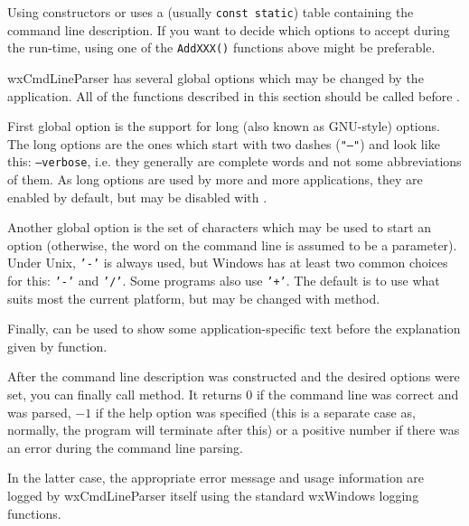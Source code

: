 Using constructors or  uses a (usually 
{\tt const static}) table containing the command line description. If you want
to decide which options to accept during the run-time, using one of the 
{\tt AddXXX()} functions above might be preferable.

\label{wxcmdlineparsercustomization}

wxCmdLineParser has several global options which may be changed by the
application. All of the functions described in this section should be called
before .

First global option is the support for long (also known as GNU-style) options.
The long options are the ones which start with two dashes ({\tt "--"}) and look
like this: {\tt --verbose}, i.e. they generally are complete words and not some
abbreviations of them. As long options are used by more and more applications,
they are enabled by default, but may be disabled with 
.

Another global option is the set of characters which may be used to start an
option (otherwise, the word on the command line is assumed to be a parameter).
Under Unix, {\tt '-'} is always used, but Windows has at least two common
choices for this: {\tt '-'} and {\tt '/'}. Some programs also use {\tt '+'}.
The default is to use what suits most the current platform, but may be changed
with  method.

Finally,  can be used to show some
application-specific text before the explanation given by 
 function.

\label{wxcmdlineparserparsing}

After the command line description was constructed and the desired options were
set, you can finally call  method.
It returns $0$ if the command line was correct and was parsed, $-1$ if the help
option was specified (this is a separate case as, normally, the program will
terminate after this) or a positive number if there was an error during the
command line parsing.

In the latter case, the appropriate error message and usage information are
logged by wxCmdLineParser itself using the standard wxWindows logging functions.

